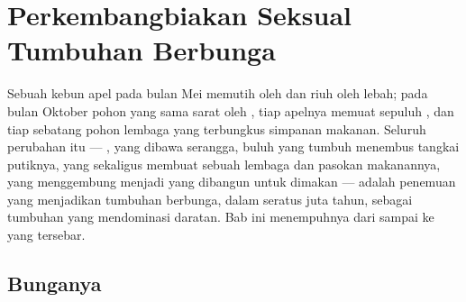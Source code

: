\chapter{Perkembangbiakan Seksual Tumbuhan Berbunga}\label{ch:b2:angiosperm-reproduction}

Sebuah kebun apel pada bulan Mei memutih oleh  dan riuh oleh
lebah; pada bulan Oktober pohon yang sama sarat oleh , tiap apelnya
memuat sepuluh , dan tiap  sebatang pohon lembaga yang
terbungkus simpanan makanan. Seluruh perubahan itu --- ,  yang dibawa serangga, buluh yang tumbuh menembus tangkai putiknya,
 yang sekaligus membuat sebuah lembaga dan pasokan
makanannya,  yang menggembung menjadi  yang dibangun
untuk dimakan --- adalah penemuan yang menjadikan tumbuhan berbunga,
dalam seratus juta tahun, sebagai tumbuhan yang mendominasi daratan.
Bab ini menempuhnya dari  sampai ke  yang tersebar.

\section{Bunganya}


